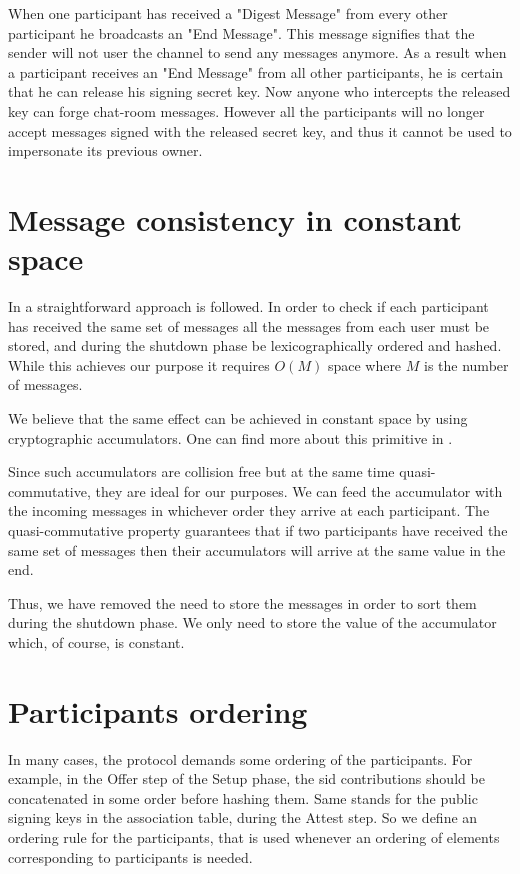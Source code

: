 When one participant has received a "Digest Message" from every other participant he broadcasts an "End Message".
This message signifies that the sender will not user the channel to send any messages anymore.
As a result when a participant receives an "End Message" from all other participants, he is certain that he can release his signing secret key.
Now anyone who intercepts the released key can forge chat-room messages.
However all the participants will no longer accept messages signed with the released secret key, and thus it cannot be used to impersonate its previous owner.


\section{Message consistency in constant space}
In \cite{mpotr} a straightforward approach is followed. In order to check if
each participant has received the same set of messages all the messages from
each user must be stored, and during the shutdown phase be lexicographically
ordered and hashed. While this achieves our purpose it requires $O(M)$ space
where $M$ is the number of messages.

We believe that the same effect can be achieved in constant space by using
cryptographic accumulators. One can find more about this primitive in \cite{accum_def}.

Since such accumulators are collision free but at the same time quasi-commutative,
they are ideal for our purposes. We can feed the accumulator with the incoming
messages in whichever order they arrive at each participant. The quasi-commutative
property guarantees that if two participants have received the same set of messages
then their accumulators will arrive at the same value in the end.

Thus, we have removed the need to store the messages in order to sort them during
the shutdown phase. We only need to store the value of the accumulator which,
of course, is constant.

\section{Participants ordering}
In many cases, the protocol demands some ordering of the participants. For example, in the Offer step of the Setup phase, the sid contributions should be concatenated in some order before hashing them. Same stands for the public signing keys in the association table, during the Attest step. So we define an ordering rule for the participants, that is used whenever an ordering of elements corresponding to participants is needed.

